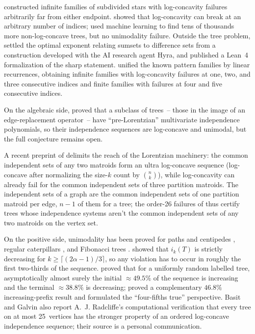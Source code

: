 \documentclass[12pt,oneside]{article}
\theoremstyle{remark}
\begin{document}
\textcite{galvin2025} constructed infinite families of subdivided stars with log-concavity failures arbitrarily far from either endpoint.
\textcite{bautistaramos2025} showed that log-concavity can break at an arbitrary number of indices; \textcite{ramos2025} used machine learning to find tens of thousands more non-log-concave trees, but no unimodality failure.
Outside the tree problem, \textcite{linli2026} settled the optimal exponent relating sumsets to difference sets from a construction developed with the AI research agent Hyra, and published a Lean~4 formalization of the sharp statement.
\textcite{bautistaramos2026recurrences} unified the known pattern families by linear recurrences, obtaining infinite families with log-concavity failures at one, two, and three consecutive indices and finite families with failures at four and five consecutive indices.

On the algebraic side, \textcite{bendjeddou2024} proved that a subclass of trees~-- those in the image of an edge-replacement operator~-- have \enquote{pre-Lorentzian} multivariate independence polynomials, so their independence sequences are log-concave and unimodal, but the full conjecture remains open.

A recent preprint of \textcite{schweitzer2026} delimits the reach of the Lorentzian machinery: the common independent sets of any two matroids form an ultra log-concave sequence (log-concave after normalizing the size-$k$ count by $\binom{n}{k}$), while log-concavity can already fail for the common independent sets of three partition matroids.
The independent sets of a graph are the common independent sets of one partition matroid per edge, $n-1$ of them for a tree; the order-26 failures of \textcite{kadrawi2025} thus certify trees whose independence systems aren't the common independent sets of any two matroids on the vertex set.

On the positive side, unimodality has been proved for paths and centipedes \citep{alavi1987}, regular caterpillars \citep{galvinhilyard2018}, and Fibonacci trees \citep{bencs2018}.
\textcite{levit2006} showed that $i_k(T)$ is strictly decreasing for $k \ge \lceil (2\alpha - 1)/3 \rceil$, so any violation has to occur in roughly the first two-thirds of the sequence.
\textcite{basitgalvin2020} proved that for a uniformly random labelled tree, asymptotically almost surely the initial $\approx 49.5\%$ of the sequence is increasing and the terminal $\approx 38.8\%$ is decreasing; \textcite{heilman2025} proved a complementary $46.8\%$ increasing-prefix result and formulated the \enquote{four-fifths true} perspective.
Basit and Galvin also report A.~J. Radcliffe's computational verification that every tree on at most 25~vertices has the stronger property of an ordered log-concave independence sequence; their source is a personal communication.
\end{document}
